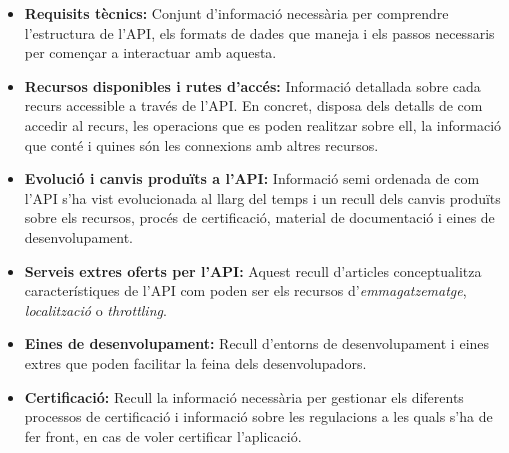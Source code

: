     \begin{itemize}
        \item \textbf{Requisits tècnics:} Conjunt d’informació necessària per comprendre l’estructura de l'\gls{API}, els formats de dades que maneja i els passos necessaris per començar a interactuar amb aquesta.
        \item \textbf{Recursos disponibles i rutes d’accés:} Informació detallada sobre cada recurs accessible a través de l'\gls{API}. En concret, disposa dels detalls de com accedir al recurs, les operacions que es poden realitzar sobre ell, la informació que conté i quines són les connexions amb altres recursos.
        \item \textbf{Evolució i canvis produïts a l'\gls{API}:} Informació semi ordenada de com l'\gls{API} s’ha vist evolucionada al llarg del temps i un recull dels canvis produïts sobre els recursos, procés de certificació, material de documentació i eines de desenvolupament.
        \item \textbf{Serveis extres oferts per l'\gls{API}:} Aquest recull d’articles conceptualitza ca\-rac\-te\-rís\-ti\-ques de l'\gls{API} com poden ser els recursos d'\emph{emmagatzematge}, \emph{lo\-ca\-lit\-za\-ció} o \emph{throttling}.
        \item \textbf{Eines de desenvolupament:} Recull d’entorns de desenvolupament i eines extres que poden facilitar la feina dels desenvolupadors.
        \item \textbf{Certificació:} Recull la informació necessària per gestionar els diferents processos de certificació i informació sobre les regulacions a les quals s'ha de fer front, en cas de voler certificar l'aplicació.
    \end{itemize}

